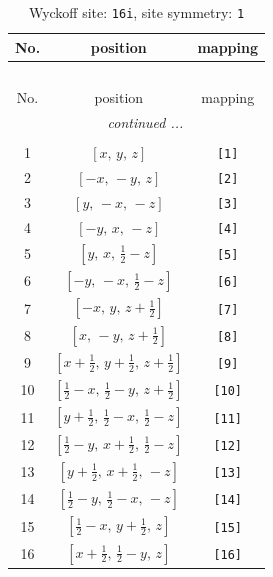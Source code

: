 \documentclass[fleqn,8pt]{jsarticle}
\begin{document}
\begin{longtable}{ccc}
\caption{Wyckoff site: {\tt 16i}, site symmetry: {\tt 1}}
 \\
 \hline \hline
No. & position & mapping \\ \hline \endfirsthead

\multicolumn{2}{l}{\tablename\ \thetable{}} \\
 \hline \hline
No. & position & mapping \\ \hline \endhead

 \hline \hline
\multicolumn{2}{r}{\footnotesize\it continued ...} \\ \endfoot

 \hline \hline
\multicolumn{2}{r}{} \\ \endlastfoot

1 & $\left[ x,\, y,\, z \right]$ & {\tt [1]} \\ \hline
2 & $\left[ - x,\, - y,\, z \right]$ & {\tt [2]} \\ \hline
3 & $\left[ y,\, - x,\, - z \right]$ & {\tt [3]} \\ \hline
4 & $\left[ - y,\, x,\, - z \right]$ & {\tt [4]} \\ \hline
5 & $\left[ y,\, x,\, \frac{1}{2} - z \right]$ & {\tt [5]} \\ \hline
6 & $\left[ - y,\, - x,\, \frac{1}{2} - z \right]$ & {\tt [6]} \\ \hline
7 & $\left[ - x,\, y,\, z + \frac{1}{2} \right]$ & {\tt [7]} \\ \hline
8 & $\left[ x,\, - y,\, z + \frac{1}{2} \right]$ & {\tt [8]} \\ \hline
9 & $\left[ x + \frac{1}{2},\, y + \frac{1}{2},\, z + \frac{1}{2} \right]$ & {\tt [9]} \\ \hline
10 & $\left[ \frac{1}{2} - x,\, \frac{1}{2} - y,\, z + \frac{1}{2} \right]$ & {\tt [10]} \\ \hline
11 & $\left[ y + \frac{1}{2},\, \frac{1}{2} - x,\, \frac{1}{2} - z \right]$ & {\tt [11]} \\ \hline
12 & $\left[ \frac{1}{2} - y,\, x + \frac{1}{2},\, \frac{1}{2} - z \right]$ & {\tt [12]} \\ \hline
13 & $\left[ y + \frac{1}{2},\, x + \frac{1}{2},\, - z \right]$ & {\tt [13]} \\ \hline
14 & $\left[ \frac{1}{2} - y,\, \frac{1}{2} - x,\, - z \right]$ & {\tt [14]} \\ \hline
15 & $\left[ \frac{1}{2} - x,\, y + \frac{1}{2},\, z \right]$ & {\tt [15]} \\ \hline
16 & $\left[ x + \frac{1}{2},\, \frac{1}{2} - y,\, z \right]$ & {\tt [16]} \\
\end{longtable}
\end{document}
